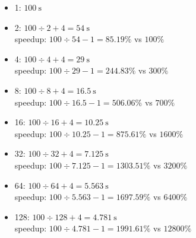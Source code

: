\documentclass[paper=a4, fontsize=11pt]{scrartcl} %
\begin{document}
\begin{itemize}
\item{1:} $\SI{100}{\second}$
\item{2:} $100\div 2 + 4 = \SI{54}{\second}$\\
  speedup: $100\div 54 - 1 = 85.19\%$ vs $100\%$
\item{4:} $100\div 4 + 4 = \SI{29}{\second}$\\
  speedup: $100\div 29 - 1 = 244.83\%$ vs $300\%$
\item{8:} $100\div 8 + 4 = \SI{16.5}{\second}$\\
  speedup: $100\div 16.5 - 1 = 506.06\%$ vs $700\%$
\item{16:} $100\div 16 + 4 = \SI{10.25}{\second}$\\
  speedup: $100\div 10.25 - 1 = 875.61\%$ vs $1600\%$
\item{32:} $100\div 32 + 4 = \SI{7.125}{\second}$\\
  speedup: $100\div 7.125 - 1 = 1303.51\%$ vs $3200\%$
\item{64:} $100\div 64 + 4 = \SI{5.563}{\second}$\\
  speedup: $100\div 5.563 - 1 = 1697.59\%$ vs $6400\%$
\item{128:} $100\div 128 + 4 = \SI{4.781}{\second}$\\
  speedup: $100\div 4.781 - 1 = 1991.61\%$ vs $12800\%$
\end{itemize}

\pagebreak
\end{document}
